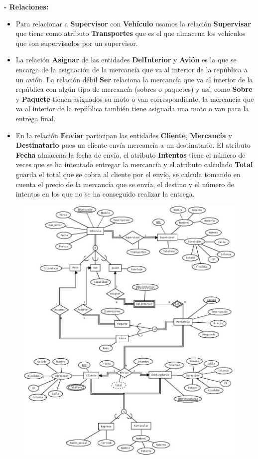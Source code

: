 \documentclass[letterpaper,11pt]{article}
\begin{document}
\begin{itemize}
\textbf{- Relaciones:}
\begin{itemize}
    \item Para relacionar a \textbf{Supervisor} con \textbf{Vehículo} usamos la relación \textbf{Supervisar} que tiene como atributo \textbf{Transportes} que es el que almacena los vehículos que son supervisados por un supervisor.
    \item La relación \textbf{Asignar} de las entidades \textbf{DelInterior} y \textbf{Avión} es la que se encarga de la asignación de la mercancía que va al interior de la república a un avión. La relación débil \textbf{Ser} relaciona la mercancía que va al interior de la república con algún tipo de mercancía (sobres o paquetes) y así, como \textbf{Sobre} y \textbf{Paquete} tienen asignados su moto o van correspondiente, la mercancía que va al interior de la república también tiene asignada una moto o van para la entrega final.
    \item En la relación \textbf{Enviar} participan las entidades \textbf{Cliente}, \textbf{Mercancía} y \textbf{Destinatario} pues un cliente envía mercancía a un destinatario. El atributo \textbf{Fecha} almacena la fecha de envío, el atributo \textbf{Intentos} tiene el número de veces que se ha intentado entregar la mercancía y el atributo calculado \textbf{Total} guarda el total que se cobra al cliente por el envío, se calcula tomando en cuenta el precio de la mercancía que se envía, el destino y el número de intentos en los que no se ha conseguido realizar la entrega.
\end{itemize}

 \begin{figure}[H]
 \centering
 \includegraphics[scale=0.666]{./imagenes/Ejercicio2a.jpeg}
 \end{figure}


\end{itemize}
\end{document}

